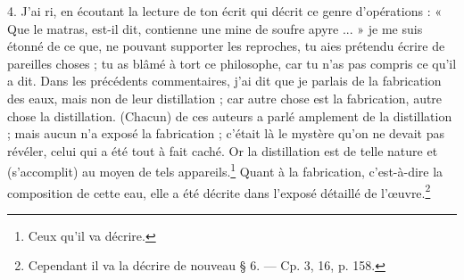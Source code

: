 \documentclass[landscape, a4paper, 11pt, oneside, polutonikogreek, french]{article}
\begin{document}
4. J'ai ri, en écoutant la lecture de ton écrit qui décrit ce genre d'opérations : « Que le matras, est-il dit, contienne une mine de soufre apyre ... » je me suis étonné de ce que, ne pouvant supporter les reproches, tu aies prétendu écrire de pareilles choses ; tu as blâmé à tort ce philosophe, car tu n'as pas compris ce qu'il a dit. Dans les précédents commentaires, j'ai dit que je parlais de la fabrication des eaux, mais non de leur distillation ; car autre chose est la fabrication, autre chose la distillation. (Chacun) de ces auteurs a parlé amplement de la distillation ; mais aucun n'a exposé la fabrication ; c'était là le mystère qu'on ne devait pas révéler, celui qui a été tout à fait caché. Or la distillation est de telle nature et (s'accomplit) au moyen de tels appareils.\footnote{Ceux qu'il va décrire.} Quant à la fabrication, c'est-à-dire la composition de cette eau, elle a été décrite dans l'exposé détaillé de l'œuvre.\footnote{Cependant il va la décrire de nouveau § 6. --- Cp. 3, 16, p. 158.}
\end{document}
